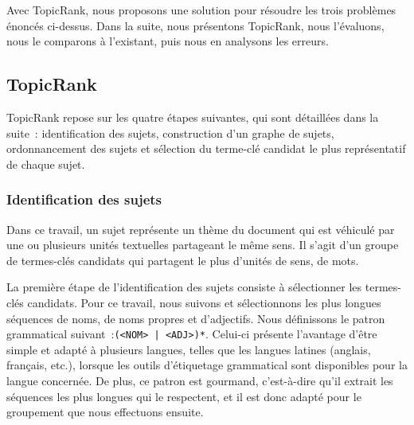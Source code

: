     Avec TopicRank, nous proposons une solution pour résoudre les trois
    problèmes énoncés ci-dessus. Dans la suite, nous présentons TopicRank, nous
    l'évaluons, nous le comparons à l'existant, puis nous en analysons les
    erreurs.

    \subsection{TopicRank}
    \label{subsec:main-automatic_keyphrase_annotation-unsupervised_automatic_keyphrase_extraction-topicrank}
      TopicRank repose sur les quatre étapes suivantes, qui sont détaillées dans
      la suite~: identification des sujets, construction d'un graphe de sujets,
      ordonnancement des sujets et sélection du terme-clé candidat le plus
      représentatif de chaque sujet.

      \subsubsection{Identification des sujets}
      \label{subsubsec:main-automatic_keyphrase_annotation-unsupervised_automatic_keyphrase_extraction-topicrank-topic_identification}
        Dans ce travail, un sujet représente un thème du document qui est
        véhiculé par une ou plusieurs unités textuelles partageant le même
        sens. Il s'agit d'un groupe de termes-clés candidats qui partagent le
        plus d'unités de sens, de mots.

        La première étape de l'identification des sujets consiste à sélectionner
        les termes-clés candidats.
        Pour ce travail, nous suivons  et
        sélectionnons les plus longues séquences de noms, de noms propres et
        d'adjectifs. Nous définissons le patron grammatical
        suivant~:\texttt{(<NOM> | <ADJ>)*}. Celui-ci présente l'avantage d'être simple
        et adapté à plusieurs langues, telles que les langues latines (anglais, français, etc.), lorsque les
        outils d'étiquetage grammatical sont disponibles pour la langue
        concernée. De plus, ce patron est gourmand, c'est-à-dire qu'il extrait
        les séquences les plus longues qui le respectent, et il est donc adapté
        pour le groupement que nous effectuons ensuite.

